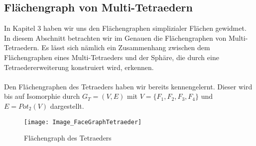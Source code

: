 \documentclass[12pt,titlepage,twoside,cleardoublepage]{article}
\theoremstyle{nummermitklammern}
\numberwithin{equation}{section}
\begin{document}
\subsection{Flächengraph von Multi-Tetraedern}
In Kapitel 3 haben wir uns den Flächengraphen simplizialer Flächen gewidmet. In diesem Abschnitt betrachten wir im Genauen die Flächengraphen von Multi-Tetraedern. Es lässt sich nämlich ein Zusammenhang zwischen dem Flächengraphen eines Multi-Tetraeders und der Sphäre, die durch eine Tetraedererweiterung konstruiert wird, erkennen.\\\\
Den Flächengraphen des Tetraeders haben wir bereits kennengelernt. Dieser wird bis auf Isomorphie durch $G_T=(V,E)$ mit $V=\{F_1,F_2,F_3,F_4\}$ und $E=Pot_2(V)$ dargestellt.
\begin{figure}[H]
\begin{center}
\texttt{[image: Image\_FaceGraphTetraeder]}
\end{center}
\caption{Flächengraph des Tetraeders}
\end{figure}
\end{document}
